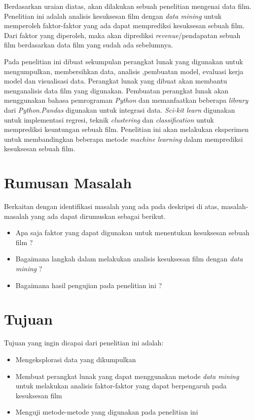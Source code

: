 Berdasarkan uraian diatas, akan dilakukan sebuah penelitian mengenai data film. Penelitian ini adalah analisis kesuksesan film dengan \textit{data mining} untuk memperoleh faktor-faktor yang ada dapat memprediksi  kesuksesan sebuah film. Dari faktor yang diperoleh, maka akan diprediksi \textit{revenue}/pendapatan sebuah film berdasarkan data film yang sudah ada sebelumnya. 
	
Pada penelitian ini dibuat sekumpulan perangkat lunak yang digunakan untuk mengumpulkan, membersihkan data, analisis ,pembuatan model, evaluasi kerja model dan visualisasi data. Perangkat lunak yang dibuat akan membantu menganalisis data film yang digunakan. Pembuatan perangkat lunak akan menggunakan bahasa pemrograman \textit{Python} dan memanfaatkan beberapa \textit{library} dari \textit{Python}.\textit{Pandas} digunakan untuk integrasi data. \textit{Sci-kit learn} digunakan untuk implementasi regresi, teknik \textit{clustering} dan \textit{classification} untuk memprediksi keuntungan sebuah film. Penelitian ini akan melakukan eksperimen untuk membandingkan beberapa metode \textit{machine learning} dalam memprediksi kesuksesan sebuah film.


\section{Rumusan Masalah}
\label{sec:rumusan}
Berkaitan dengan identifikasi masalah yang ada pada deskripsi di atas, masalah-masalah yang ada dapat dirumuskan sebagai berikut. 

\begin{itemize}
\item Apa saja faktor yang dapat digunakan untuk menentukan kesuksesan sebuah film ?
\item Bagaimana langkah dalam melakukan analisis kesuksesan film dengan \textit{data mining} ? 
\item Bagaimana hasil pengujian pada penelitian ini ?
\end{itemize}


\section{Tujuan}
\label{sec:tujuan}
Tujuan yang ingin dicapai dari penelitian ini adalah:  

\begin{itemize}
\item Mengeksplorasi data yang dikumpulkan
\item Membuat perangkat lunak yang dapat menggunakan metode \textit{data mining} untuk melakukan analisis faktor-faktor yang dapat berpengaruh pada kesuksesan film
\item Menguji metode-metode yang digunakan pada penelitian ini
\end{itemize} 

